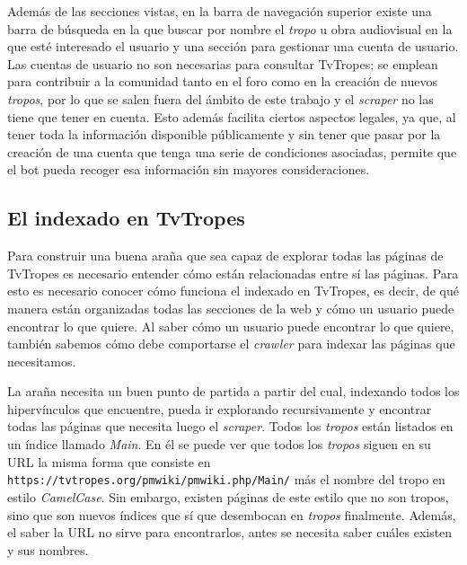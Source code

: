 Además de las secciones vistas, en la barra de navegación superior existe una
barra de búsqueda en la que buscar por nombre el \textit{tropo} u obra
audiovisual en la que esté interesado el usuario y una sección para gestionar
una cuenta de usuario. Las cuentas de usuario no son necesarias para consultar
TvTropes; se emplean para contribuir a la comunidad tanto en el foro como en la
creación de nuevos \textit{tropos}, por lo que se salen fuera del ámbito de este
trabajo y el \textit{scraper} no las tiene que tener en cuenta. Esto además
facilita ciertos aspectos legales, ya que, al tener toda la información
disponible públicamente y sin tener que pasar por la creación de una cuenta que
tenga una serie de condiciones asociadas, permite que el bot pueda recoger esa
información sin mayores consideraciones.

\subsection{El indexado en TvTropes}
Para construir una buena araña que sea capaz de explorar todas las páginas de
TvTropes es necesario entender cómo están relacionadas entre sí las páginas.
Para esto es necesario conocer cómo funciona el indexado en TvTropes, es decir,
de qué manera están organizadas todas las secciones de la web y cómo un usuario
puede encontrar lo que quiere. Al saber cómo un usuario puede encontrar lo que
quiere, también sabemos cómo debe comportarse el \textit{crawler} para indexar
las páginas que necesitamos.

La araña necesita un buen punto de partida a partir del cual, indexando todos
los hipervínculos que encuentre, pueda ir explorando recursivamente y encontrar
todas las páginas que necesita luego el \textit{scraper}. Todos los
\textit{tropos} están listados en un índice llamado \textit{Main}. En él se
puede ver que todos los \textit{tropos} siguen en su URL la misma forma que
consiste en \texttt{https://tvtropes.org/pmwiki/pmwiki.php/Main/} más el nombre
del tropo en estilo \textit{CamelCase}. Sin embargo, existen páginas de este
estilo que no son tropos, sino que son nuevos índices que sí que desembocan en
\textit{tropos} finalmente. Además, el saber la URL no sirve para encontrarlos,
antes se necesita saber cuáles existen y sus nombres.

